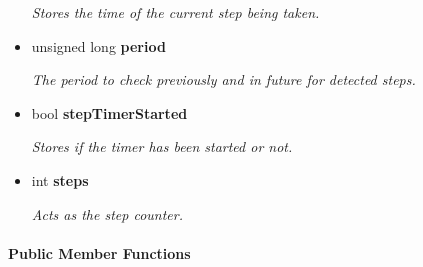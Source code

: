 \begin{itemize}
                \quad \quad \textit{Stores the time of the current step being taken.}

            \item unsigned long \textbf{period}
            
                \quad \quad \textit{The period to check previously and in future for detected steps.}
                
            \item bool \textbf{stepTimerStarted}
            
                \quad \quad \textit{Stores if the timer has been started or not.}
                
            \item int \textbf{steps}
            
                \quad \quad \textit{Acts as the step counter.}\\

        \end{itemize}


    \paragraph{Public Member Functions}\mbox{}\\

